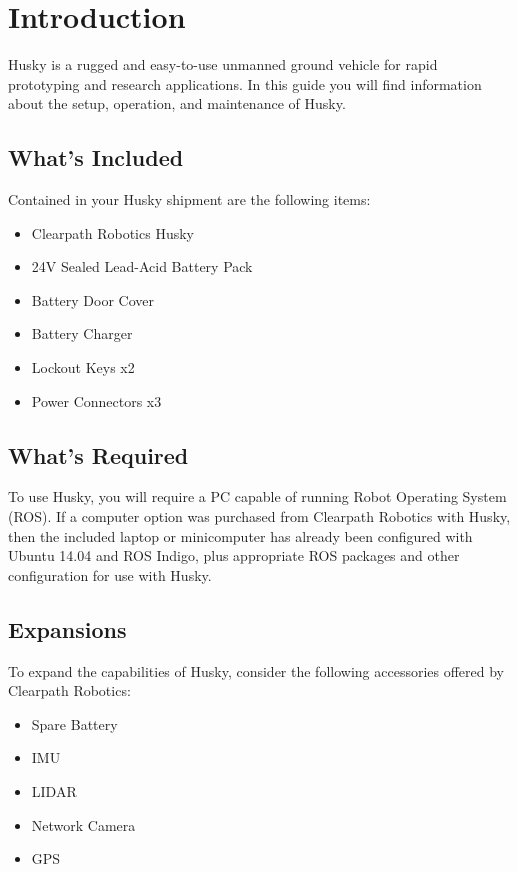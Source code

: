 \documentclass[]{clearpath-latex/clearpath-manual}
\begin{document}
\tableofcontents

\section{Introduction}

Husky is a rugged and easy-to-use unmanned ground vehicle for rapid prototyping and research applications. In this guide you will find information about the setup, operation, and maintenance of Husky.

\subsection{What's Included}

Contained in your Husky shipment are the following items:

\begin{itemize}[nolistsep]
  \item Clearpath Robotics Husky
  \item 24V Sealed Lead-Acid Battery Pack
  \item Battery Door Cover
  \item Battery Charger
  \item Lockout Keys x2
  \item Power Connectors x3
\end{itemize}


\subsection{What's Required}

To use Husky, you will require a PC capable of running Robot Operating System (ROS).
If a computer option was purchased from Clearpath Robotics with Husky, then the included laptop or minicomputer has 
already been configured with Ubuntu 14.04 and ROS Indigo, plus appropriate ROS packages and other configuration for use with Husky.

\subsection{Expansions}
To expand the capabilities of Husky, consider the following accessories offered by Clearpath Robotics:


\begin{itemize}[nolistsep]
  \item Spare Battery
  \item IMU
  \item LIDAR
  \item Network Camera
  \item GPS
\end{itemize}
\end{document}
